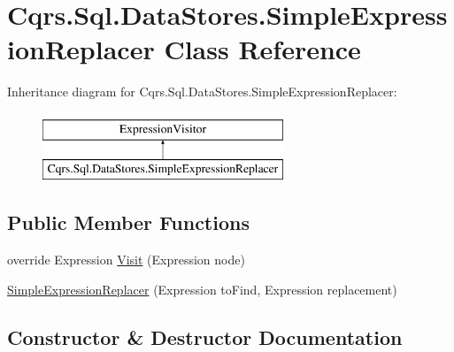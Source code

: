 \hypertarget{classCqrs_1_1Sql_1_1DataStores_1_1SimpleExpressionReplacer}{}\section{Cqrs.\+Sql.\+Data\+Stores.\+Simple\+Expression\+Replacer Class Reference}
\label{classCqrs_1_1Sql_1_1DataStores_1_1SimpleExpressionReplacer}
Inheritance diagram for Cqrs.\+Sql.\+Data\+Stores.\+Simple\+Expression\+Replacer\+:\begin{figure}[H]
\begin{center}
\leavevmode
\includegraphics[height=2.000000cm]{classCqrs_1_1Sql_1_1DataStores_1_1SimpleExpressionReplacer}
\end{center}
\end{figure}
\subsection*{Public Member Functions}
\begin{DoxyCompactItemize}
\item 
override Expression \hyperlink{classCqrs_1_1Sql_1_1DataStores_1_1SimpleExpressionReplacer_a362c833782ea518d3b10f74898136241}{Visit} (Expression node)
\item 
\hyperlink{classCqrs_1_1Sql_1_1DataStores_1_1SimpleExpressionReplacer_a71555cd5aeb393426bedce91d3325cd0}{Simple\+Expression\+Replacer} (Expression to\+Find, Expression replacement)
\end{DoxyCompactItemize}


\subsection{Constructor \& Destructor Documentation}
\mbox{\label{classCqrs_1_1Sql_1_1DataStores_1_1SimpleExpressionReplacer_a71555cd5aeb393426bedce91d3325cd0}} 
